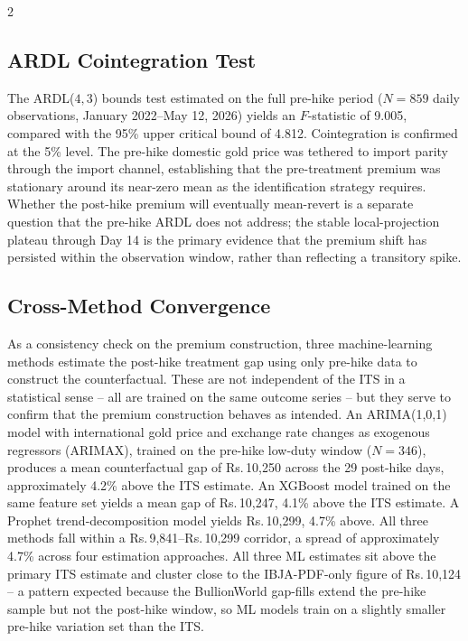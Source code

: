 \documentclass[12pt]{article}
\begin{document}
\begin{multicols}{2}

\subsection*{ARDL Cointegration Test}

The ARDL($4,3$) bounds test estimated on the full pre-hike period ($N = 859$ daily observations, January 2022--May 12, 2026) yields an $F$-statistic of 9.005, compared with the \citet{Pesaran2001} 95\% upper critical bound of 4.812. Cointegration is confirmed at the 5\% level. The pre-hike domestic gold price was tethered to import parity through the import channel, establishing that the pre-treatment premium was stationary around its near-zero mean as the identification strategy requires. Whether the post-hike premium will eventually mean-revert is a separate question that the pre-hike ARDL does not address; the stable local-projection plateau through Day 14 is the primary evidence that the premium shift has persisted within the observation window, rather than reflecting a transitory spike.

\subsection*{Cross-Method Convergence}

As a consistency check on the premium construction, three machine-learning methods estimate the post-hike treatment gap using only pre-hike data to construct the counterfactual. These are not independent of the ITS in a statistical sense -- all are trained on the same outcome series -- but they serve to confirm that the premium construction behaves as intended. An ARIMA(1,0,1) model with international gold price and exchange rate changes as exogenous regressors (ARIMAX), trained on the pre-hike low-duty window ($N = 346$), produces a mean counterfactual gap of Rs.\,10,250 across the 29 post-hike days, approximately 4.2\% above the ITS estimate. An XGBoost model trained on the same feature set yields a mean gap of Rs.\,10,247, 4.1\% above the ITS estimate. A Prophet trend-decomposition model yields Rs.\,10,299, 4.7\% above. All three methods fall within a Rs.\,9,841--Rs.\,10,299 corridor, a spread of approximately 4.7\% across four estimation approaches. All three ML estimates sit above the primary ITS estimate and cluster close to the IBJA-PDF-only figure of Rs.\,10,124 -- a pattern expected because the BullionWorld gap-fills extend the pre-hike sample but not the post-hike window, so ML models train on a slightly smaller pre-hike variation set than the ITS.


\end{multicols}
\end{document}
